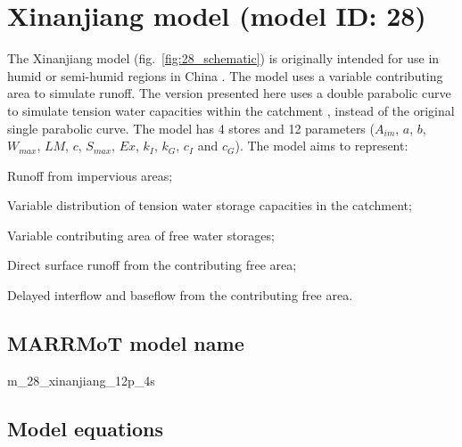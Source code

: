 \section{Xinanjiang model (model ID: 28)}
The Xinanjiang model (fig.~\ref{fig:28_schematic}) is originally intended for use in humid or semi-humid regions in China \citep{Zhao1992}. The model uses a variable contributing area to simulate runoff. The version presented here uses a double parabolic curve to simulate tension water capacities within the catchment \citep{Jayawardena2000}, instead of the original single parabolic curve. The model has 4 stores and 12 parameters ($A_{im}$, $a$, $b$, $W_{max}$, $LM$, $c$, $S_{max}$, $Ex$, $k_I$, $k_G$, $c_I$ and $c_G$). The model aims to represent:

\begin{itemizecompact}
\item Runoff from impervious areas;
\item Variable distribution of tension water storage capacities in the catchment;
\item Variable contributing area of free water storages;
\item Direct surface runoff from the contributing free area;
\item Delayed interflow and baseflow from the contributing free area.
\end{itemizecompact}

\subsection{MARRMoT model name}
m\_28\_xinanjiang\_12p\_4s \\

\subsection{Model equations}

